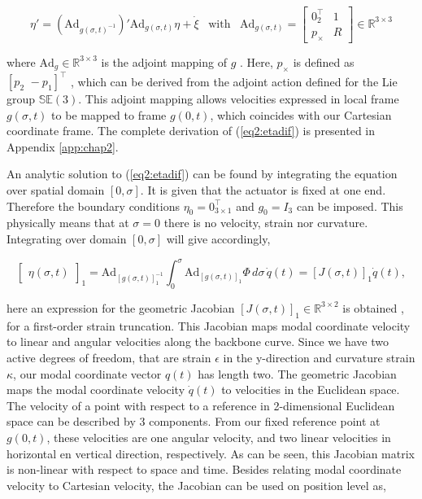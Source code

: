 \begin{equation}
    \eta'= (\text{Ad}_{g(\sigma,t)^{-1}})'\text{Ad}_{g(\sigma,t)} \eta + \Dot{\xi} \hspace{10pt} \text{with} \hspace{10pt} \text{Ad}_{g(\sigma,t)} = \begin{bmatrix} 0_2^\top & 1 \\ p_\times & R  \end{bmatrix} \in \mathbb{R}^{3\times 3}
    \label{eq2:etadif}
\end{equation}


where $\text{Ad}_g \in \mathbb{R}^{3 \times 3}$ \cite{2DLie} is the adjoint mapping of $g$ \cite{Sola2018}. Here, $p_\times$ is defined as $[p_2 \hspace{4pt} -p_1]^\top$ \cite{2DLie}, which can be derived from the adjoint action defined for the Lie group $\mathbb{SE}(3)$. This adjoint mapping allows velocities expressed in local frame $g(\sigma,t)$ to be mapped to frame $g(0,t)$, which coincides with our Cartesian coordinate frame. The complete derivation of (\ref{eq2:etadif}) is presented in Appendix \ref{app:chap2}. 

An analytic solution to (\ref{eq2:etadif}) can be found by integrating the equation over spatial domain $[0,\sigma]$. It is given that the actuator is fixed at one end. Therefore the boundary conditions $\eta_0 = 0_{3 \times 1}^\top$ and $g_0 = I_{3}$ can be imposed. This physically means that at $\sigma = 0$ there is no velocity, strain nor curvature. Integrating over domain $[0,\sigma]$ will give accordingly,

\begin{equation}
  \begin{bmatrix} \eta(\sigma,t)\end{bmatrix}_1 = \text{Ad}_{[g(\sigma,t)]_1^{-1}} \int_0^{\sigma} \text{Ad}_{[g(\sigma,t)]_1} \Phi \hspace{2pt} d \sigma  \hspace{2pt} \dot{q}(t) = [J(\sigma,t)]_1\dot{q}(t),
    \label{eq2:J}
\end{equation}

here an expression for the geometric Jacobian $[J(\sigma,t)]_1 \in \mathbb{R}^{3\times 2}$ is obtained \cite{Caasenbrood2020}, for a first-order strain truncation. This Jacobian maps modal coordinate velocity to linear and angular velocities along the backbone curve. Since we have two active degrees of freedom, that are strain $\epsilon$ in the y-direction and curvature strain $\kappa$, our modal coordinate vector $q(t)$ has length two. The geometric Jacobian maps the modal coordinate velocity $\dot{q}(t)$ to velocities in the Euclidean space. The velocity of a point with respect to a reference in 2-dimensional Euclidean space can be described by 3 components. From our fixed reference point at $g(0,t)$, these velocities are one angular velocity, and two linear velocities in horizontal en vertical direction, respectively. As can be seen, this Jacobian matrix is non-linear with respect to space and time. Besides relating modal coordinate velocity to Cartesian velocity, the Jacobian can be used on position level as,

